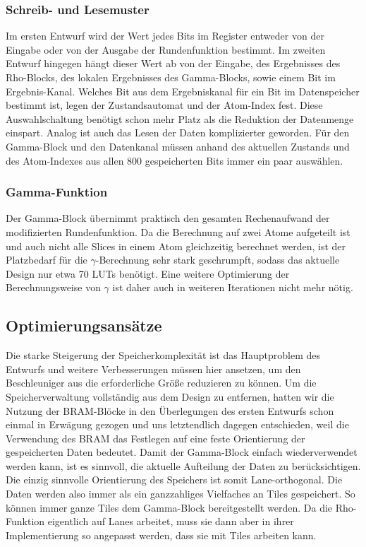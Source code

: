 \subsubsection{Schreib- und Lesemuster}
Im ersten Entwurf wird der Wert jedes Bits im Register entweder von der Eingabe oder von der Ausgabe der Rundenfunktion bestimmt.
Im zweiten Entwurf hingegen hängt dieser Wert ab von der Eingabe, des Ergebnisses des Rho-Blocks, des lokalen Ergebnisses des Gamma-Blocks, sowie einem Bit im Ergebnis-Kanal.
Welches Bit aus dem Ergebniskanal für ein Bit im Datenspeicher bestimmt ist, legen der Zustandsautomat und der Atom-Index fest.
Diese Auswahlschaltung benötigt schon mehr Platz als die Reduktion der Datenmenge einspart.
Analog ist auch das Lesen der Daten komplizierter geworden. Für den Gamma-Block und den Datenkanal müssen
anhand des aktuellen Zustands und des Atom-Indexes aus allen 800 gespeicherten Bits immer ein paar auswählen.

\subsubsection{Gamma-Funktion}
Der Gamma-Block übernimmt praktisch den gesamten Rechenaufwand der modifizierten Rundenfunktion. Da die Berechnung auf
zwei Atome aufgeteilt ist und auch nicht alle Slices in einem Atom gleichzeitig berechnet werden, ist der Platzbedarf für
die $\gamma$-Berechnung sehr stark geschrumpft, sodass das aktuelle Design nur etwa 70 LUTs benötigt.
Eine weitere Optimierung der Berechnungsweise von $\gamma$ ist daher auch in weiteren Iterationen nicht mehr nötig.

\subsection{Optimierungsansätze}
Die starke Steigerung der Speicherkomplexität ist das Hauptproblem des Entwurfs und weitere Verbesserungen müssen hier ansetzen,
um den Beschleuniger aus die erforderliche Größe reduzieren zu können. Um die Speicherverwaltung vollständig aus dem Design zu entfernen,
hatten wir die Nutzung der BRAM-Blöcke in den Überlegungen des ersten Entwurfs schon einmal in Erwägung gezogen und uns letztendlich dagegen entschieden,
weil die Verwendung des BRAM das Festlegen auf eine feste Orientierung der gespeicherten Daten bedeutet. Damit der Gamma-Block einfach wiederverwendet werden kann,
ist es sinnvoll, die aktuelle Aufteilung der Daten zu berücksichtigen. Die einzig sinnvolle Orientierung des Speichers ist somit Lane-orthogonal.
Die Daten werden also immer als ein ganzzahliges Vielfaches an Tiles gespeichert. So können immer ganze Tiles dem Gamma-Block bereitgestellt werden.
Da die Rho-Funktion eigentlich auf Lanes arbeitet, muss sie dann aber in ihrer Implementierung so angepasst werden, dass sie mit Tiles arbeiten kann.

